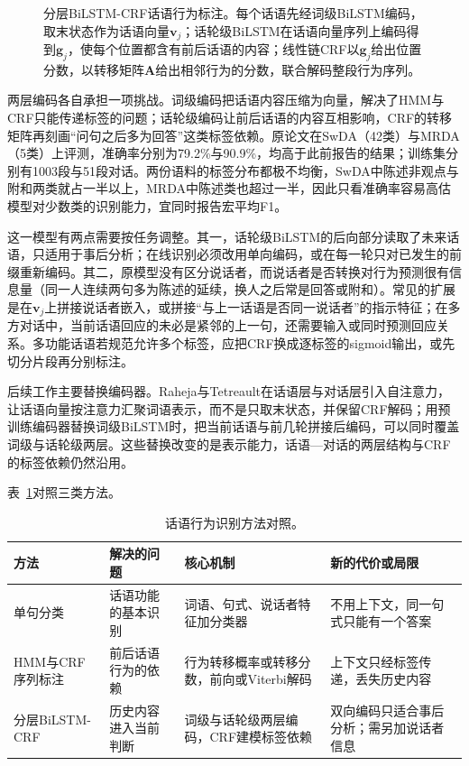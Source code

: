 \begin{figure}[htbp]
  \centering
  
  \caption{分层BiLSTM-CRF话语行为标注。每个话语先经词级BiLSTM编码，取末状态作为话语向量$\bm v_j$；话轮级BiLSTM在话语向量序列上编码得到$\bm g_j$，使每个位置都含有前后话语的内容；线性链CRF以$\bm g_j$给出位置分数，以转移矩阵$\bm A$给出相邻行为的分数，联合解码整段行为序列。}
  \label{fig:nlp-analysis-hierarchical-dialogue-act}
\end{figure}

两层编码各自承担一项挑战。词级编码把话语内容压缩为向量，解决了HMM与CRF只能传递标签的问题；话轮级编码让前后话语的内容互相影响，CRF的转移矩阵再刻画“问句之后多为回答”这类标签依赖。原论文在SwDA（42类）与MRDA（5类）上评测，准确率分别为79.2\%与90.9\%，均高于此前报告的结果；训练集分别有1003段与51段对话。两份语料的标签分布都极不均衡，SwDA中陈述非观点与附和两类就占一半以上，MRDA中陈述类也超过一半，因此只看准确率容易高估模型对少数类的识别能力，宜同时报告宏平均F1。

这一模型有两点需要按任务调整。其一，话轮级BiLSTM的后向部分读取了未来话语，只适用于事后分析；在线识别必须改用单向编码，或在每一轮只对已发生的前缀重新编码。其二，原模型没有区分说话者，而说话者是否转换对行为预测很有信息量（同一人连续两句多为陈述的延续，换人之后常是回答或附和）。常见的扩展是在$\bm v_j$上拼接说话者嵌入，或拼接“与上一话语是否同一说话者”的指示特征；在多方对话中，当前话语回应的未必是紧邻的上一句，还需要输入或同时预测回应关系。多功能话语若规范允许多个标签，应把CRF换成逐标签的sigmoid输出，或先切分片段再分别标注。

后续工作主要替换编码器。Raheja与Tetreault在话语层与对话层引入自注意力，让话语向量按注意力汇聚词语表示，而不是只取末状态，并保留CRF解码\cite{nlp-analysis-raheja2019}；用预训练编码器替换词级BiLSTM时，把当前话语与前几轮拼接后编码，可以同时覆盖词级与话轮级两层。这些替换改变的是表示能力，话语—对话的两层结构与CRF的标签依赖仍然沿用。

表~\ref{tab:nlp-analysis-dialogue-act-methods}对照三类方法。

\begin{table}[htbp]
  \centering
  \small
  \begin{tabularx}{\linewidth}{@{}l XXX@{}}
    \toprule
    方法 & 解决的问题 & 核心机制 & 新的代价或局限\\
    \midrule
    单句分类 & 话语功能的基本识别 & 词语、句式、说话者特征加分类器 & 不用上下文，同一句式只能有一个答案\\
    HMM与CRF序列标注 & 前后话语行为的依赖 & 行为转移概率或转移分数，前向或Viterbi解码 & 上下文只经标签传递，丢失历史内容\\
    分层BiLSTM-CRF & 历史内容进入当前判断 & 词级与话轮级两层编码，CRF建模标签依赖 & 双向编码只适合事后分析；需另加说话者信息\\
    \bottomrule
  \end{tabularx}
  \caption{话语行为识别方法对照。}
  \label{tab:nlp-analysis-dialogue-act-methods}
\end{table}

